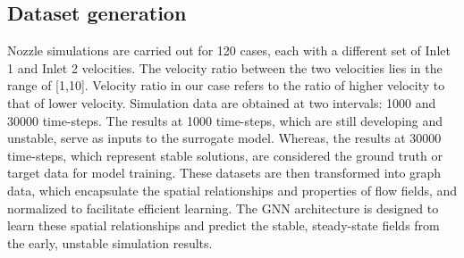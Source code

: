 \subsection{Dataset generation}
Nozzle simulations are carried out for 120 cases, each with a different set of Inlet 1 and Inlet 2 velocities. The velocity ratio between the two velocities lies in the range of [1,10]. Velocity ratio in our case refers to the ratio of higher velocity to that of lower velocity.
Simulation data are obtained at two intervals: 1000 and 30000 time-steps. The results at 1000 time-steps, which are still developing and unstable, serve as inputs to the surrogate model.  Whereas, the results at 30000 time-steps, which represent stable solutions, are considered the ground truth or target data for model training. These datasets are then transformed into graph data, which encapsulate the spatial relationships and properties of flow fields, and normalized to facilitate efficient learning. The GNN architecture is designed to learn these spatial relationships and predict the stable, steady-state fields from the early, unstable simulation results.
